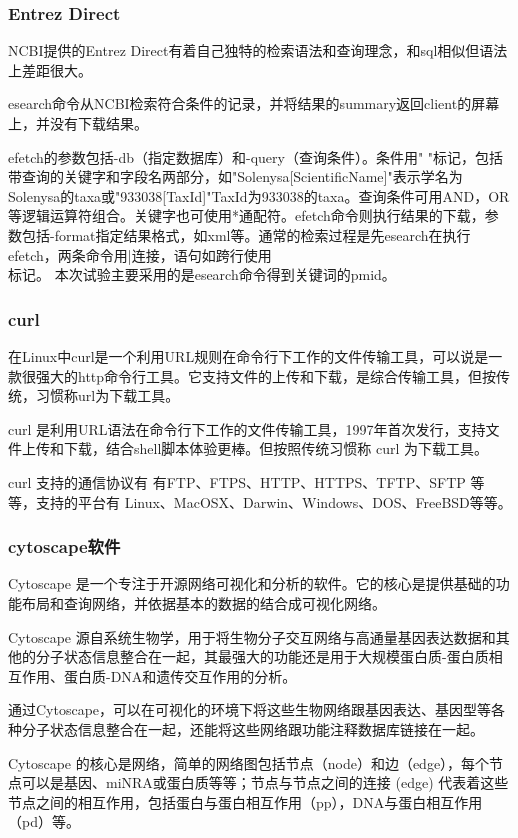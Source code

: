 \documentclass[12pt]{article}
\begin{document}
	\subsubsection{Entrez Direct}
	NCBI提供的Entrez Direct有着自己独特的检索语法和查询理念，和sql相似但语法上差距很大。\par
	esearch命令从NCBI检索符合条件的记录，并将结果的summary返回client的屏幕上，并没有下载结果。\par
	efetch的参数包括-db（指定数据库）和-query（查询条件）。条件用" "标记，包括带查询的关键字和字段名两部分，如"Solenysa[ScientificName]"表示学名为Solenysa的taxa或"933038[TaxId]"TaxId为933038的taxa。查询条件可用AND，OR等逻辑运算符组合。关键字也可使用*通配符。efetch命令则执行结果的下载，参数包括-format指定结果格式，如xml等。通常的检索过程是先esearch在执行efetch，两条命令用|连接，语句如跨行使用\\标记。
	本次试验主要采用的是esearch命令得到关键词的pmid。
	\subsubsection{curl}
	在Linux中curl是一个利用URL规则在命令行下工作的文件传输工具，可以说是一款很强大的http命令行工具。它支持文件的上传和下载，是综合传输工具，但按传统，习惯称url为下载工具。\par
	curl 是利用URL语法在命令行下工作的文件传输工具，1997年首次发行，支持文件上传和下载，结合shell脚本体验更棒。但按照传统习惯称 curl 为下载工具。\par
    curl 支持的通信协议有 有FTP、FTPS、HTTP、HTTPS、TFTP、SFTP 等等，支持的平台有 Linux、MacOSX、Darwin、Windows、DOS、FreeBSD等等。\par

	\subsubsection{cytoscape软件}
Cytoscape 是一个专注于开源网络可视化和分析的软件。它的核心是提供基础的功能布局和查询网络，并依据基本的数据的结合成可视化网络。\par
Cytoscape 源自系统生物学，用于将生物分子交互网络与高通量基因表达数据和其他的分子状态信息整合在一起，其最强大的功能还是用于大规模蛋白质-蛋白质相互作用、蛋白质-DNA和遗传交互作用的分析。\par
通过Cytoscape，可以在可视化的环境下将这些生物网络跟基因表达、基因型等各种分子状态信息整合在一起，还能将这些网络跟功能注释数据库链接在一起。\par
Cytoscape 的核心是网络，简单的网络图包括节点（node）和边（edge），每个节点可以是基因、miNRA或蛋白质等等；节点与节点之间的连接 (edge) 代表着这些节点之间的相互作用，包括蛋白与蛋白相互作用（pp），DNA与蛋白相互作用（pd）等。
\end{document}
